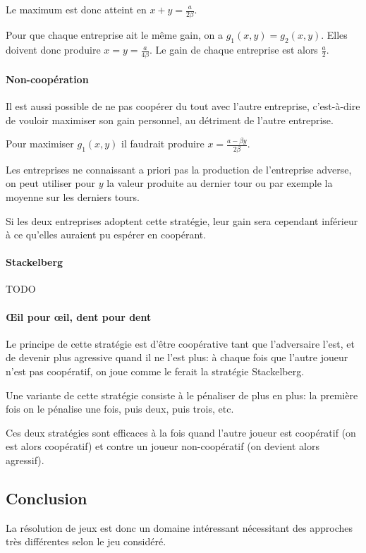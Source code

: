       Le maximum est donc atteint en $x+y=\frac a {2\beta}$.

      Pour que chaque entreprise ait le même gain, on a $g_1(x, y) = g_2(x, y)$.
      Elles doivent donc produire $x=y=\frac a {4\beta}$. Le gain de chaque
      entreprise est alors $\frac a 2$.

    \paragraph{Non-coopération} Il est aussi possible de ne pas coopérer du
      tout avec l'autre entreprise, c'est-à-dire de vouloir maximiser son gain
      personnel, au détriment de l'autre entreprise.

      Pour maximiser $g_1(x, y)$ il faudrait produire
      $x=\frac {a-\beta y} {2\beta}$.
      
      Les entreprises ne connaissant a priori pas la production de l'entreprise
      adverse, on peut utiliser pour $y$ la valeur produite au dernier tour ou
      par exemple la moyenne sur les derniers tours.

      Si les deux entreprises adoptent cette stratégie, leur gain sera
      cependant inférieur à ce qu'elles auraient pu espérer en coopérant.

    \paragraph{Stackelberg}
      TODO

    \paragraph{Œil pour œil, dent pour dent}
      Le principe de cette stratégie est d'être coopérative tant que
      l'adversaire l'est, et de devenir plus agressive quand il ne l'est plus:
      à chaque fois que l'autre joueur n'est pas coopératif, on joue comme le
      ferait la stratégie Stackelberg.

      Une variante de cette stratégie consiste à le pénaliser de plus en plus:
      la première fois on le pénalise une fois, puis deux, puis trois, etc.

      Ces deux stratégies sont efficaces à la fois quand l'autre joueur est
      coopératif (on est alors coopératif) et contre un joueur non-coopératif
      (on devient alors agressif).

\subsection{Conclusion}
  La résolution de jeux est donc un domaine intéressant nécessitant des
  approches très différentes selon le jeu considéré.
